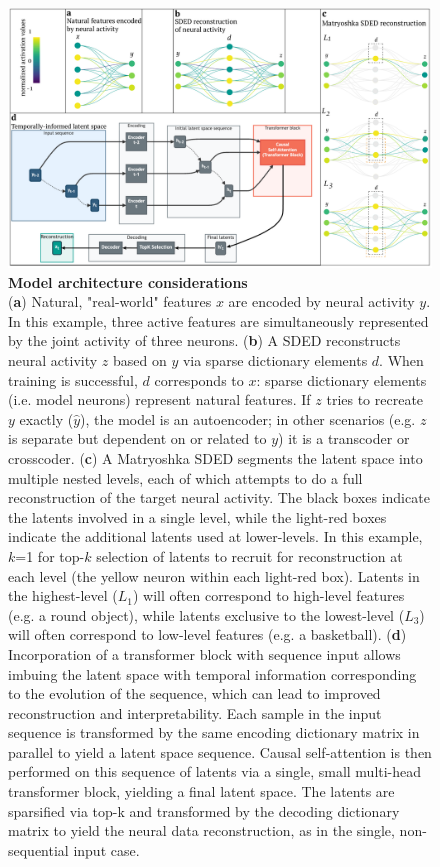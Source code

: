\begin{figure}[tbph]
    \includegraphics[width=\linewidth]{figures/sded_arch.pdf}
    \caption{
        \textbf{Model architecture considerations} \\
        \small
        (\textbf{a}) Natural, "real-world" features $x$ are encoded by neural activity $y$. In this example, three active features are simultaneously represented by the joint activity of three neurons. (\textbf{b}) A SDED reconstructs neural activity $z$ based on $y$ via sparse dictionary elements $d$. When training is successful, $d$ corresponds to $x$: sparse dictionary elements (i.e. model neurons) represent natural features. If $z$ tries to recreate $y$ exactly ($\hat{y}$), the model is an autoencoder; in other scenarios (e.g. $z$ is separate but dependent on or related to $y$) it is a transcoder or crosscoder. (\textbf{c}) A Matryoshka SDED segments the latent space into multiple nested levels, each of which attempts to do a full reconstruction of the target neural activity. The black boxes indicate the latents involved in a single level, while the light-red boxes indicate the additional latents used at lower-levels. In this example, $k$=1 for top-$k$ selection of latents to recruit for reconstruction at each level (the yellow neuron within each light-red box). Latents in the highest-level ($L_1$) will often correspond to high-level features (e.g. a round object), while latents exclusive to the lowest-level ($L_3$) will often correspond to low-level features (e.g. a basketball). (\textbf{d}) Incorporation of a transformer block with sequence input allows imbuing the latent space with temporal information corresponding to the evolution of the sequence, which can lead to improved reconstruction and interpretability. Each sample in the input sequence is transformed by the same encoding dictionary matrix in parallel to yield a latent space sequence. Causal self-attention is then performed on this sequence of latents via a single, small multi-head transformer block, yielding a final latent space. The latents are sparsified via top-k and transformed by the decoding dictionary matrix to yield the neural data reconstruction, as in the single, non-sequential input case.
        \vspace{-1em}
    }
    \label{figure:sded_arch}
\end{figure}

